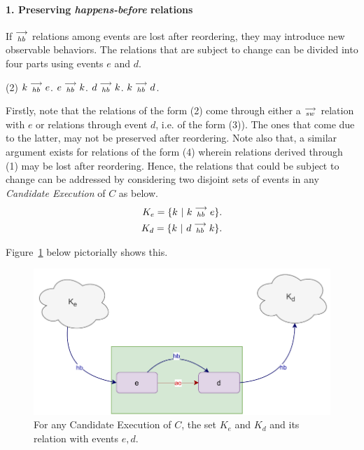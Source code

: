 
\paragraph{1. Preserving \textit{happens-before} relations}
        
    If $\stackrel{\longrightarrow}{_{hb}}$ relations among events are lost after reordering, they may introduce new observable behaviors. The relations that are subject to change can be divided into four parts using events $e$ and $d$.
    \begin{tasks}[style=enumerate](2)
        \task $k\stackrel{\longrightarrow}{_{hb}}e$.
        \task $e\stackrel{\longrightarrow}{_{hb}}k$.
        \task $d\stackrel{\longrightarrow}{_{hb}}k$.
        \task $k\stackrel{\longrightarrow}{_{hb}}d$.
    \end{tasks}

    Firstly, note that the relations of the form (2) come through either a $\stackrel{\longrightarrow}{_{sw}}$ relation with $e$ or relations through event $d$, i.e. of the form (3)). 
    The ones that come due to the latter, may not be preserved after reordering. 
    Note also that, a similar argument exists for relations of the form (4) wherein relations derived through (1) may be lost after reordering. 
    Hence, the relations that could be subject to change can be addressed by considering two disjoint sets of events in any \textit{Candidate Execution} of $C$ as below.
    \begin{align*}
       K_e = \{k \ | \ k\stackrel{\longrightarrow}{_{hb}}e \}. \\
       K_d = \{k \ | \ d\stackrel{\longrightarrow}{_{hb}}k \}. 
    \end{align*}

    Figure~\ref{reord:preserve_hb(a)} below pictorially shows this.
    \begin{figure}[H]
        \centering
        \includegraphics[scale=0.7]{4.InstructionReordering/4.ValidReorderingCandidate/ProofParts/Part1/part1(a).pdf}
        \caption{For any Candidate Execution of $C$, the set $K_e$ and $K_d$ and its relation with events $e,d$.}
        \label{reord:preserve_hb(a)}
    \end{figure}
    

